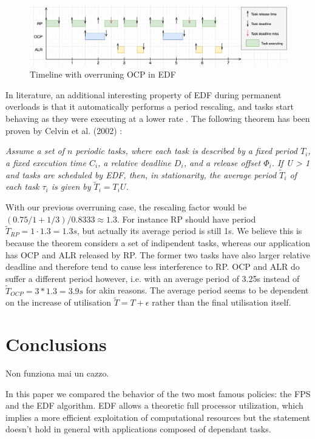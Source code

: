 \documentclass{article}
\begin{document}
\begin{figure}[!htbp]
\centering
\includegraphics[width=6.5in]{images/timeline-overload-edf-ocp}
\caption{Timeline with overruning OCP in EDF}
\label{timeline-overload-edf-ocp}
\end{figure}

In literature, an additional interesting property of EDF during permanent overloads is that it automatically performs a period rescaling, and tasks start behaving as they were executing at a lower rate \cite{buttazzo-rm-edf}. The following theorem has been proven by Celvin et al. (2002) \cite{cervin}:

\textit{Assume a set of $n$ periodic tasks, where each task is described by a fixed period $T_i$, a fixed execution time $C_i$, a relative deadline $D_i$, and a release offset $\Phi_i$. If U > 1 and tasks are scheduled by EDF, then, in stationarity, the average period $\tilde{T}_i$ of each task $\tau_i$ is given by $\tilde{T}_i = T_iU$.}

With our previous overruning case, the rescaling factor would be $(0.75 / 1 + 1/3) / 0.8333 \approx 1.3$. For instance RP should have period $\tilde{T}_{RP} = 1 \cdot 1.3 = 1.3s$, but actually its average period is still 1s. We believe this is because the theorem considers a set of indipendent tasks, whereas our application has OCP and ALR released by RP. The former two tasks have also larger relative deadline and therefore tend to cause less interference to RP. OCP and ALR do suffer a different period however, i.e. with an average period of 3.25s instead of $\tilde{T}_{OCP} = 3 * 1.3 = 3.9s$ for akin reasons. The average period seems to be dependent on the increase of utilisation $\tilde{T} = T + \epsilon$ rather than the final utilisation itself.

\section{Conclusions}

Non funziona mai un cazzo.

In this paper we compared the behavior of the two most famous policies: the FPS and the EDF algorithm. EDF allows a theoretic full processor utilization, which implies a more efficient exploitation of computational resources but the statement doesn't hold in general with applications composed of dependant tasks.
\end{document}
